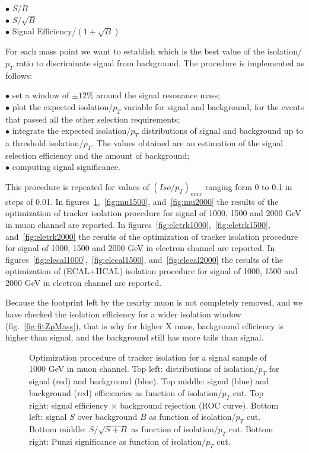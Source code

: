 \documentclass[12pt]{article} %
\begin{document}
\noindent
$\bullet$ $S/B$ \\
$\bullet$ $S/\sqrt{B}$ \\
$\bullet$ Signal Efficiency/$(1+\sqrt{B})$

For each mass point we want to establish which is the best value of the isolation/$p_T$ ratio to discriminate signal from background. The procedure is implemented as follows:

\noindent
$\bullet$ set a window of $\pm12\%$ around the signal resonance mass; \\
$\bullet$ plot the expected isolation/$p_T$ variable for signal and background, for the events that passed all the other selection requirements; \\
$\bullet$ integrate the expected isolation/$p_T$ distributions of signal and background up to a threshold isolation/$p_T$. The values obtained are an estimation of the signal selection efficiency and the amount of background; \\
$\bullet$ computing signal significance. 

This procedure is repeated for values of $(Iso/p_T)_{max}$ ranging form 0 to 0.1 in steps of 0.01. In figures~\ref{fig:mu1000},~\ref{fig:mu1500}, and~\ref{fig:mu2000} the results of the optimization of tracker isolation procedure for signal of 1000, 1500 and 2000 GeV in muon channel are reported. In figures~\ref{fig:eletrk1000},~\ref{fig:eletrk1500}, and~\ref{fig:eletrk2000} the results of the optimization of tracker isolation procedure for signal of 1000, 1500 and 2000 GeV in electron channel are reported. In figures~\ref{fig:elecal1000},~\ref{fig:elecal1500}, and~\ref{fig:elecal2000} the results of the optimization of (ECAL+HCAL) isolation procedure for signal of 1000, 1500 and 2000 GeV in electron channel are reported.

Because the footprint left by the nearby muon is not completely removed, and we have checked the isolation efficiency for a wider isolation window (fig.~\ref{fig:fitZpMass}), that is why for higher X mass, background efficiency is higher than signal, and the background still has more tails than signal.

\newpage


\begin{figure}[H] %
  \caption{Optimization procedure of tracker isolation for a signal sample of 1000 GeV in muon channel. Top left: distributions of isolation/$p_T$ for signal (red) and background (blue). Top middle: signal (blue) and background (red) efficiencies as function of isolation/$p_T$ cut. Top right: signal efficiency $\times$ background rejection (ROC curve). Bottom left: signal $S$ over background $B$ as function of isolation/$p_T$ cut. Bottom middle: $S/\sqrt{S + B}$ as function of isolation/$p_T$ cut. Bottom right: Punzi significance as function of isolation/$p_T$ cut.}
  \label{fig:mu1000}
\end{figure}
\end{document}
